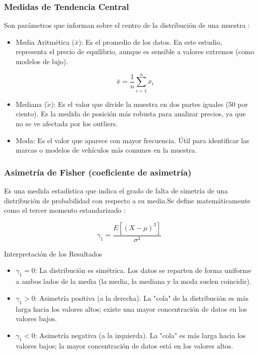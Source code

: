 \documentclass[oneside,11pt]{Latex/Classes/PhDthesisPSnPDF}
\begin{document}
\subsubsection {Medidas de Tendencia Central}

Son parámetros que informan sobre el centro de la distribución de una
muestra \citep{rivas2000}:

\begin{itemize}
  \item Media Aritmética ($\bar{x}$): Es el promedio de los datos. En este estudio, representa el precio de equilibrio, aunque es sensible a valores extremos (como modelos de lujo).
  
  $$\bar{x} = \frac{1}{n} \sum_{i=1}^{n} x_i$$

  \item Mediana ($\tilde{x}$): Es el valor que divide la muestra en dos partes iguales (50 por ciento). Es la medida de posición más robusta para analizar precios, ya que no se ve afectada por los outliers.
  
  \item Moda: Es el valor que aparece con mayor frecuencia. Útil para identificar las marcas o modelos de vehículos más comunes en la muestra.

\end{itemize}

\subsubsection {Asimetría de Fisher (coeficiente de asimetría)}

Es una medida estadística que indica el grado de falta de simetría de
una distribución de probabilidad con respecto a su media.Se define
matemáticamente como el tercer momento estandarizado \citep{salama2002}:

\[\gamma_1 = \frac{E[(X - \mu)^3]}{\sigma^3}\]

Interpretación de los Resultados

\begin{itemize}
  \item $\gamma_1 = 0$: La distribución es simétrica. Los datos se reparten de forma uniforme a ambos lados de la media (la media, la mediana y la moda suelen coincidir).
  \item $\gamma_1 > 0$: Asimetría positiva (a la derecha). La "cola" de la distribución es más larga hacia los valores altos; existe una mayor concentración de datos en los valores bajos.
  \item$\gamma_1 < 0$: Asimetría negativa (a la izquierda). La "cola" es más larga hacia los valores bajos; la mayor concentración de datos está en los valores altos.
\end{itemize}
\end{document}

